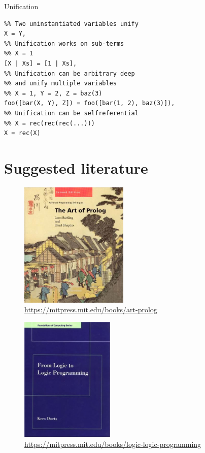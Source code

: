 \documentclass[presentation]{beamer}
\begin{document}
\begin{frame}[fragile,label=sec-1-7]{Unification}
 \begin{verbatim}
%% Two uninstantiated variables unify
X = Y,
%% Unification works on sub-terms
%% X = 1
[X | Xs] = [1 | Xs],
%% Unification can be arbitrary deep
%% and unify multiple variables
%% X = 1, Y = 2, Z = baz(3)
foo([bar(X, Y), Z]) = foo([bar(1, 2), baz(3)]),
%% Unification can be selfreferential
%% X = rec(rec(rec(...)))
X = rec(X)
\end{verbatim}
\end{frame}

\section{Suggested literature}
\label{sec-2}
\begin{figure}[htb]
\centering
\includegraphics[height=6cm]{./images/the-art-of-prolog.jpg}
\caption{\url{https://mitpress.mit.edu/books/art-prolog}}
\end{figure}

\begin{figure}[htb]
\centering
\includegraphics[height=6cm]{./images/from-logic-to-logic-programming.jpg}
\caption{\url{https://mitpress.mit.edu/books/logic-logic-programming}}
\end{figure}
\end{document}
